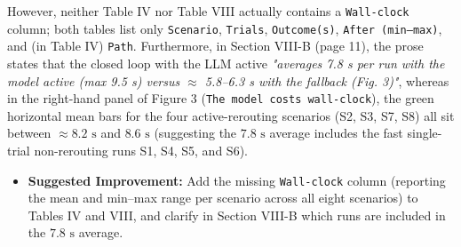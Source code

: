 \documentclass[11pt,a4paper]{article}
\begin{document}
However, neither Table IV nor Table VIII actually contains a \texttt{Wall-clock} column; both tables list only \texttt{Scenario}, \texttt{Trials}, \texttt{Outcome(s)}, \texttt{After (min–max)}, and (in Table IV) \texttt{Path}. Furthermore, in Section VIII-B (page 11), the prose states that the closed loop with the LLM active \emph{"averages 7.8 s per run with the model active (max 9.5 s) versus $\approx$ 5.8–6.3 s with the fallback (Fig. 3)"}, whereas in the right-hand panel of Figure 3 (\texttt{The model costs wall-clock}), the green horizontal mean bars for the four active-rerouting scenarios (S2, S3, S7, S8) all sit between $\approx 8.2\text{ s}$ and $8.6\text{ s}$ (suggesting the $7.8\text{ s}$ average includes the fast single-trial non-rerouting runs S1, S4, S5, and S6).
\begin{itemize}[leftmargin=1.8em,itemsep=2pt]
\item \textbf{Suggested Improvement:} Add the missing \texttt{Wall-clock} column (reporting the mean and min–max range per scenario across all eight scenarios) to Tables IV and VIII, and clarify in Section VIII-B which runs are included in the $7.8\text{ s}$ average.
\end{itemize}
\end{document}
